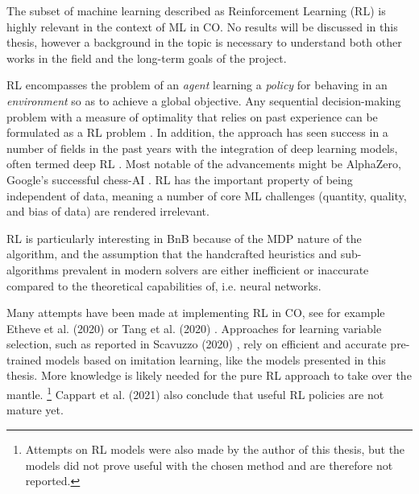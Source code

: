 The subset of machine learning described as Reinforcement Learning (\gls{RL}) is highly relevant in the context of \gls{ML} in \gls{CO}. No results will be discussed in this thesis, however a background in the topic is necessary to understand both other works in the field and the long-term goals of the project.

\gls{RL} encompasses the problem of an \textit{agent} learning a \textit{policy} for behaving in an \textit{environment} so as to achieve a global objective. Any sequential decision-making problem with a measure of optimality that relies on past experience can be formulated as a \gls{RL} problem \cite{francois2018introduction}. In addition, the approach has seen success in a number of fields in the past years with the integration of deep learning models, often termed deep \gls{RL} \cite{francois2018introduction}. Most notable of the advancements might be AlphaZero, Google's successful chess-AI \cite{silver2017mastering}. \gls{RL} has the important property of being independent of data, meaning a number of core \gls{ML} challenges (quantity, quality, and bias of data) are rendered irrelevant. 

\gls{RL} is particularly interesting in \gls{BnB} because of the \gls{MDP} nature of the algorithm, and the assumption that the handcrafted heuristics and sub-algorithms prevalent in modern solvers are either inefficient or inaccurate compared to the theoretical capabilities of, i.e. neural networks. 

Many attempts have been made at implementing \gls{RL} in \gls{CO}, see for example Etheve et al. (2020) \cite{etheve2020reinforcement} or Tang et al. (2020) \cite{tang2020reinforcement}. Approaches for learning variable selection, such as reported in Scavuzzo (2020) \cite{scavuzzo2020learning}, rely on efficient and accurate pre-trained models based on imitation learning, like the models presented in this thesis. More knowledge is likely needed for the pure \gls{RL} approach to take over the mantle.
\footnote{Attempts on \gls{RL} models were also made by the author of this thesis, but the models did not prove useful with the chosen method and are therefore not reported.}
Cappart et al. (2021) \cite{cappart2021combinatorial} also conclude that useful \gls{RL} policies are not mature yet. 
